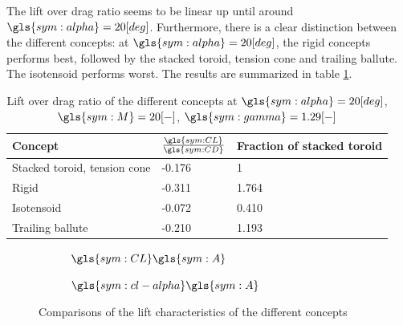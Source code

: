 The lift over drag ratio seems to be linear up until around $\gls{sym:alpha}=20 [deg]$. Furthermore, there is a clear distinction between the different concepts: at $\gls{sym:alpha}=20 [deg]$, the rigid concepts performs best, followed by the stacked toroid, tension cone and trailing ballute. The isotensoid performs worst. The results are summarized in table \ref{tab:clcd}.

\begin{table}[H]
	\caption{Lift over drag ratio of the different concepts at $\gls{sym:alpha}=20 [deg]$, $\gls{sym:M}=20[-]$, $\gls{sym:gamma}=1.29[-]$}%
	\label{tab:clcd}%
	\begin{tabular}{|p{}|p{}|p{}|}
		\hline
		\textbf{Concept}  				& \textbf{$\frac{\gls{sym:CL}}{\gls{sym:CD}}$}	& \textbf{Fraction of stacked toroid}	\\ \hline \hline
		Stacked toroid, tension cone	& -0.176     				& 1								\\ \hline
		Rigid  							& -0.311					& 1.764						\\ \hline
		Isotensoid  					& -0.072					& 0.410						\\ \hline
		Trailing ballute				& -0.210					& 1.193						\\ \hline
	\end{tabular}
\end{table}

\begin{figure}[h]
	\centering
	\begin{subfigure}[b]{0.49\textwidth}
		\setlength{} 
		\setlength{}
		
		\caption{$\gls{sym:CL}\gls{sym:A}$}
		\label{fig:cl}
	\end{subfigure}
	\begin{subfigure}[b]{0.49\textwidth}
		\setlength{} 
		\setlength{}
		
		\caption{$\gls{sym:cl-alpha}\gls{sym:A}$}
		\label{fig:claplha}
	\end{subfigure}
	\caption{Comparisons of the lift characteristics of the different concepts}
	\label{fig:clplots}
\end{figure}


